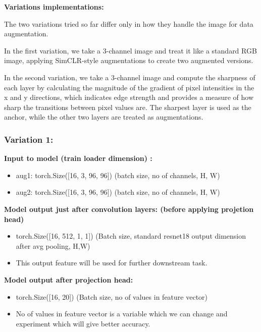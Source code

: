 \textbf{Variations implementations:}  \label{sec:variations_implementations}

The two variations tried so far differ only in how they handle the image for data augmentation. 

In the first variation, we take a 3-channel image and treat it like a standard RGB image, applying SimCLR-style augmentations to create two augmented versions.

In the second variation, we take a 3-channel image and compute the sharpness of each layer by calculating the magnitude of the gradient of pixel intensities in the x and y directions, which indicates edge strength and provides a measure of how sharp the transitions between pixel values are. The sharpest layer is used as the anchor, while the other two layers are treated as augmentations. 

\subsubsection{Variation 1:}
\textbf{Input to model (train loader dimension) :} 

\begin{itemize}
  \item aug1: torch.Size([16, 3, 96, 96])        (batch size, no of channels, H, W)
  \item aug2: torch.Size([16, 3, 96, 96])        (batch size, no of channels, H, W) \vspace{1em}
\end{itemize} \vspace{1em}
\textbf{Model output just after convolution layers: (before applying projetion head)} 
\begin{itemize}
  \item torch.Size([16, 512, 1, 1]) (Batch size, standard resnet18 output dimension after avg pooling, H,W)   
  \item This output feature will be used for further downstream task.  \vspace{1em}
\end{itemize}

\textbf{Model output after projection head:}
\begin{itemize}
  \item torch.Size([16, 20])  (Batch size, no of values in feature vector)  
  \item No of values in feature vector is a variable which we can change and experiment which will give better accuracy.
\end{itemize}

